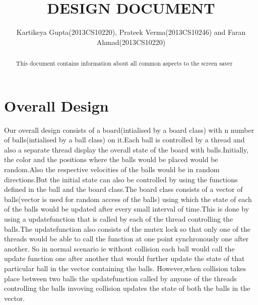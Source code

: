 \setlength{\topmargin}{-.5in}
\setlength{\textheight}{9in}
\setlength{\oddsidemargin}{.125in}
\setlength{\textwidth}{6.25in}

\title
{DESIGN DOCUMENT}
\author
{Kartikeya Gupta(2013CS10220), Prateek Verma(2013CS10246) and Faran Ahmad(2013CS10220)}
\renewcommand{\today}{January 10, 2015}
\maketitle 
\begin{abstract}
This document contains information about all common aspects to the screen saver
\end{abstract}
\pagebreak 
\section{Overall Design}
Our overall design consists of a board(intialised by a board class) with n number of balls(intialised by a ball class) on it.Each ball is controlled by a thread and also a separate thread display the overall state of the board with balls.Initially, the color and the positions where the balls would be placed would be random.Also the respective velocities of the balls would be in random directions.But the initial state can also be controlled by using the functions defined in the ball and the board class.The board class consists of a vector of balls(vector is used for random access of the balls) using which the state of each of the balls would be updated after every small interval of time.This is done by using a updatefunction that is called by each of the thread controlling the balls.The updatefunction also consists of the mutex lock so that only one of the threads would be able to call the function at one point synchronously one after another.
So in normal scenario ie without collision each ball would call the update function one after another that would further update the state of that particular ball in the vector containing the balls.
However,when collision takes place between two balls the updatefunction called by anyone of the threads controlling the balls invoving collision updates the state of both the balls in the vector.
